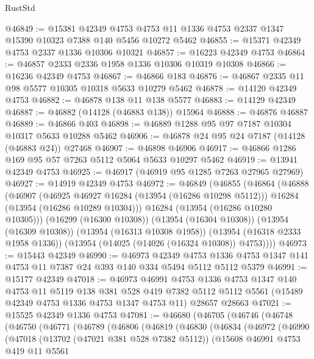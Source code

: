 \begin{lexlean}{RustStd}
\begin{coremodule}
@46849 := @15381
    @42349
    @4753
    @4753
    @11
    @1336
    @4753
    @2337
    @1347
    @15390
    @10323
    @7388
    @140
    @5456
    @10272
    @5462
@46855 := @15371 @42349 @4753 @2337 @1336 @10306 @10321
@46857 := @16223 @42349 @4753
@46864 := @46857 @2333 @2336 @1958 @1336 @10306 @10319 @10308
@46866 := @16236 @42349 @4753
@46867 := @46866 @183
@46876 := @46867 @2335 @11 @98 @5577 @10305 @10318 @5633 @10279 @5462
@46878 := @14120 @42349 @4753
@46882 := @46878 @138 @11 @138 @5577
@46883 := @14129 @42349
@46887 := @46882 (@14128 (@46883 @138)) @15964
@46888 := @46876 @46887
@46889 := @46866 @403
@46898 := @46889 @1288 @95 @97 @7187 @10304 @10317 @5633 @10288 @5462
@46906 := @46878 @24 @95 @24 @7187 (@14128 (@46883 @24)) @27468
@46907 := @46898 @46906
@46917 := @46866 @1286 @169 @95 @57 @7263 @5112 @5064 @5633 @10297 @5462
@46919 := @13941 @42349 @4753
@46925 := @46917 (@46919 @95 @1285 @7263 @27965 @27969)
@46927 := @14919 @42349 @4753
@46972 := @46849
    (@46855
      (@46864
        (@46888
          (@46907
            (@46925 @46927 @16284 (@13954 (@16286 @10298 @5112)))
            @16284
            (@13954 (@16286 @10289 @10304)))
          @16284
          (@13954 (@16286 @10280 @10305)))
        (@16299 (@16300 @10308))
        (@13954 (@16304 @10308))
        (@13954 (@16309 @10308))
        (@13954 (@16313 @10308 @1958))
        (@13954 (@16318 @2333 @1958 @1336))
        (@13954 (@14025 (@14026 (@16324 @10308)) @4753))))
@46973 := @15443 @42349
@46990 := @46973
    @42349
    @4753
    @1336
    @4753
    @1347
    @141
    @4753
    @11
    @7387
    @24
    @393
    @140
    @334
    @5494
    @5112
    @5112
    @5379
@46991 := @15177 @42349
@47018 := @46973
    @46991
    @4753
    @1336
    @4753
    @1347
    @140
    @4753
    @11
    @5119
    @138
    @381
    @528
    @419
    @7382
    @5112
    @5112
    @5561
    (@15489 @42349 @4753 @1336 @4753 @1347 @4753 @11)
    @28657
    @28663
@47021 := @15525 @42349 @1336 @4753
@47081 := @46680
    (@46705
      (@46746
        (@46748
          (@46750
            (@46771
              (@46789
                (@46806
                  (@46819
                    (@46830
                      (@46834
                        (@46972
                          (@46990
                            (@47018
                              (@13702 (@47021 @381 @528 @7382 @5112))
                              (@15608
                                @46991
                                @4753
                                @419
                                @11
                                @5561

\end{coremodule}
\end{lexlean}
